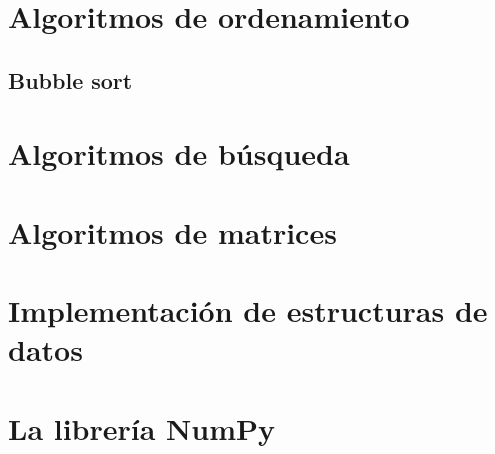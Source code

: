 \documentclass{report}
\begin{document}
\clearpage\chapter{Algoritmos de ordenamiento}

\section{Bubble sort}



\clearpage\chapter{Algoritmos de búsqueda}

\clearpage\chapter{Algoritmos de matrices}

\clearpage\chapter{Implementación de estructuras de datos}

\clearpage\chapter{La librería NumPy}
\end{document}
